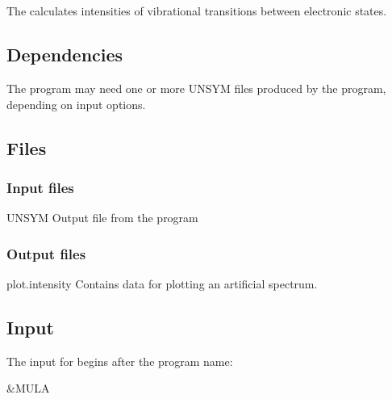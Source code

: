 \section{}
\label{sec:mula}

The  calculates intensities of vibrational
transitions between electronic states.

\subsection{Dependencies}
\label{sec:mula_dependencies}
The  program may need one or more UNSYM files produced
by the  program, depending on input options.

\subsection{Files}
\label{sec:mula_files}

\subsubsection{Input files}
\begin{filelist}
\item[UNSYM]
Output file from the  program
\end{filelist}

\subsubsection{Output files}

\begin{filelist}
\item[plot.intensity]
Contains data for plotting an artificial spectrum.

\end{filelist}

\subsection{Input}
\label{sec:mula_input}
The input for  begins after the program name:
\begin{inputlisting}
 &MULA
\end{inputlisting}

